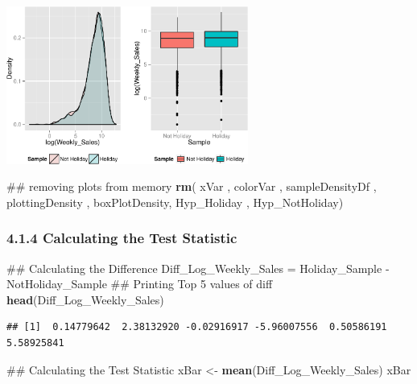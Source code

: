 \documentclass[]{article}
\newenvironment{Shaded}{\begin{snugshade}}{\end{snugshade}}
\newcommand{\KeywordTok}[1]{\textcolor[rgb]{0.13,0.29,0.53}{\textbf{{#1}}}}
\newcommand{\StringTok}[1]{\textcolor[rgb]{0.31,0.60,0.02}{{#1}}}
\newcommand{\NormalTok}[1]{{#1}}
\begin{document}
\includegraphics[width=300px]{PredictingWeeklySalesAtWalmart_files/figure-latex/visualizingTheSamplesCollected-1}

\begin{Shaded}
\begin{Highlighting}[]
\NormalTok{## removing plots from memory}
\KeywordTok{rm}\NormalTok{( xVar , colorVar , sampleDensityDf , plottingDensity , }
    \NormalTok{boxPlotDensity, Hyp_Holiday , Hyp_NotHoliday)}
\end{Highlighting}
\end{Shaded}

\subsubsection{4.1.4 Calculating the Test
Statistic}\label{calculating-the-test-statistic}

\begin{Shaded}
\begin{Highlighting}[]
\NormalTok{## Calculating the Difference}
\NormalTok{Diff_Log_Weekly_Sales =}\StringTok{ }\NormalTok{Holiday_Sample -}\StringTok{ }\NormalTok{NotHoliday_Sample}
\NormalTok{## Printing Top 5 values of diff}
\KeywordTok{head}\NormalTok{(Diff_Log_Weekly_Sales)}
\end{Highlighting}
\end{Shaded}

\begin{verbatim}
## [1]  0.14779642  2.38132920 -0.02916917 -5.96007556  0.50586191  5.58925841
\end{verbatim}

\begin{Shaded}
\begin{Highlighting}[]
\NormalTok{## Calculating the Test Statistic}
\NormalTok{xBar <-}\StringTok{ }\KeywordTok{mean}\NormalTok{(Diff_Log_Weekly_Sales)}
\NormalTok{xBar}
\end{Highlighting}
\end{Shaded}
\end{document}
